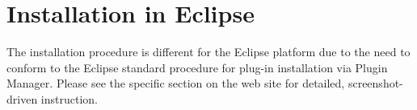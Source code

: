 \section{Installation in Eclipse}

The installation procedure is different for the Eclipse platform due to the need to conform to the Eclipse standard procedure for plug-in installation via Plugin Manager.
Please see the specific section on the \tuprolog{} web site for detailed, screenshot-driven instruction. 